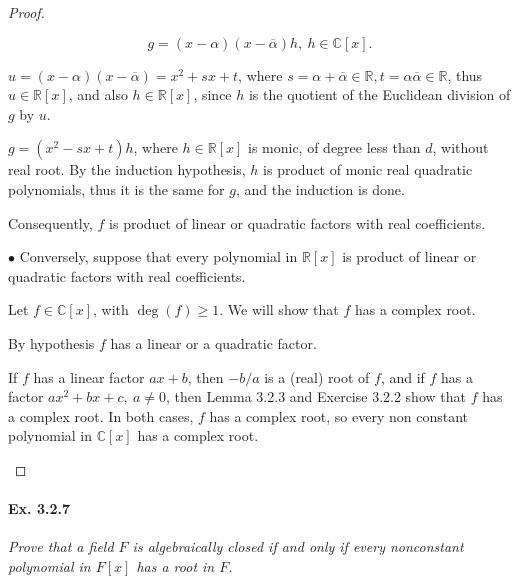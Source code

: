 \documentclass[11pt,a4paper]{article}
\newcommand{\R}{\mathbb{R}}
\newcommand{\C}{\mathbb{C}}
\begin{document}
\begin{proof}
\begin{enumerate}
$$g = (x-\alpha)(x-\overline{\alpha}) h, \ h \in \mathbb{C}[x].$$

$u = (x-\alpha)(x-\overline{\alpha}) = x^2 +sx+t$, where $s = \alpha+ \overline{\alpha} \in \mathbb{R}, t=\alpha\overline{\alpha} \in \mathbb{R}$, thus $u \in \mathbb{R}[x]$, and also $h\in \mathbb{R}[x]$, since $h$ is the quotient of the Euclidean division of $g$ by $u$.

$g = (x^2 - s x + t) h$, where $h \in \mathbb{R}[x]$ is monic, of degree less than $d$, without real root. By the induction hypothesis, $h$ is product of monic real quadratic polynomials, thus it is the same for $g$, and the induction is done.

Consequently, $f$ is product of linear or quadratic factors with real coefficients.

$\bullet$ Conversely, suppose that every polynomial in $\R[x]$ is product of linear or quadratic factors with real coefficients.

Let $f \in \C[x]$, with $\deg(f) \geq 1$. We will show that $f$ has a complex root. 

By hypothesis $f$ has a linear or a quadratic factor.

If $f$ has a linear factor $ax+b$, then $-b/a$ is a (real) root of $f$, and if $f$ has a factor $ax^2+bx+c, \ a \ne 0$, then Lemma 3.2.3 and Exercise 3.2.2 show that $f$ has a complex root. In both cases, $f$ has a complex root, so every non constant polynomial in $\C[x]$ has a complex root.
\end{enumerate}
\end{proof}

\paragraph{Ex. 3.2.7}

{\it Prove that a field $F$ is algebraically closed if and only if every nonconstant polynomial in $F[x]$ has a root in $F$.
}
\end{document}
